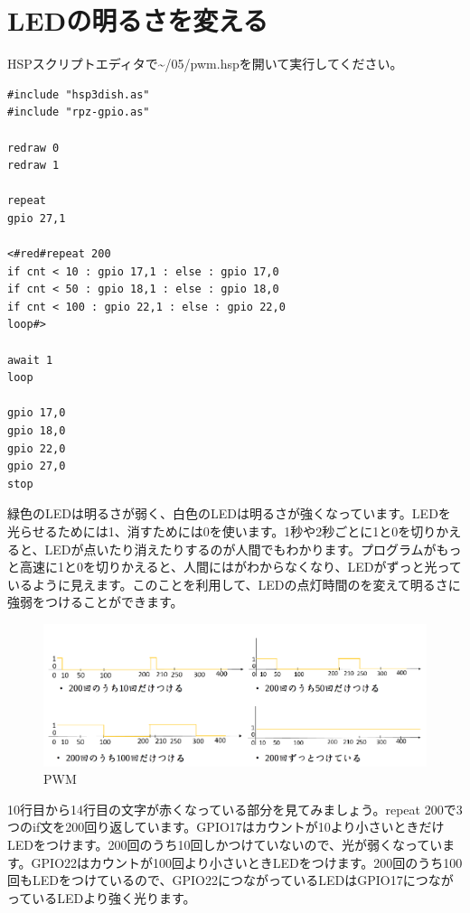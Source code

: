 \section{LEDの明るさを変える}
HSPスクリプトエディタで\textasciitilde /05/pwm.hspを開いて実行してください。\\

\begin{lstlisting}[caption=pwm.hsp,label=pwm.hsp]
#include "hsp3dish.as"
#include "rpz-gpio.as"

redraw 0
redraw 1

repeat
gpio 27,1

<#red#repeat 200
if cnt < 10 : gpio 17,1 : else : gpio 17,0
if cnt < 50 : gpio 18,1 : else : gpio 18,0
if cnt < 100 : gpio 22,1 : else : gpio 22,0
loop#>

await 1
loop

gpio 17,0
gpio 18,0
gpio 22,0
gpio 27,0
stop

\end{lstlisting}

緑色のLEDは明るさが弱く、白色のLEDは明るさが強くなっています。LEDを光らせるためには1、消すためには0を使います。1秒や2秒ごとに1と0を切りかえると、LEDが点いたり消えたりするのが人間でもわかります。プログラムがもっと高速に1と0を切りかえると、人間にはがわからなくなり、LEDがずっと光っているように見えます。このことを利用して、LEDの点灯時間のを変えて明るさに強弱をつけることができます。

\begin{figure}[H]
\centering
\includegraphics[scale=0.5]{images/chap05/text05-img035.png}
\caption{PWM}
\end{figure}

10行目から14行目の文字が赤くなっている部分を見てみましょう。repeat 200で3つのif文を200回り返しています。GPIO17はカウントが10より小さいときだけLEDをつけます。200回のうち10回しかつけていないので、光が弱くなっています。GPIO22はカウントが100回より小さいときLEDをつけます。200回のうち100回もLEDをつけているので、GPIO22につながっているLEDはGPIO17につながっているLEDより強く光ります。